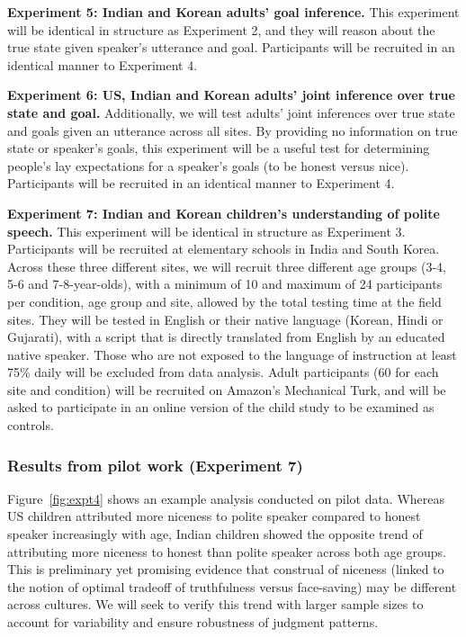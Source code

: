 {\bf Experiment 5: Indian and Korean adults' goal inference.} 
This experiment will be identical in structure as Experiment 2, and they will reason about the true state given speaker's utterance and goal. Participants will be recruited in an identical manner to Experiment 4.

{\bf Experiment 6: US, Indian and Korean adults' joint inference over true state and goal.} 
Additionally, we will test adults' joint inferences over true state and goals given an utterance across all sites. By providing no information on true state or speaker's goals, this experiment will be a useful test for determining people's lay expectations for a speaker's goals (to be honest versus nice). Participants will be recruited in an identical manner to Experiment 4.

{\bf Experiment 7: Indian and Korean children's understanding of polite speech.} 
This experiment will be identical in structure as Experiment 3. Participants will be recruited at elementary schools in India and South Korea. Across these three different sites, we will recruit three different age groups (3-4, 5-6 and 7-8-year-olds), with a minimum of 10 and maximum of 24 participants per condition, age group and site, allowed by the total testing time at the field sites. They will be tested in English or their native language (Korean, Hindi or Gujarati), with a script that is directly translated from English by an educated native speaker. Those who are not exposed to the language of instruction at least 75\% daily will be excluded from data analysis. Adult participants (60 for each site and condition) will be recruited on Amazon's Mechanical Turk, and will be asked to participate in an online version of the child study to be examined as controls.

\subsubsection{Results from pilot work (Experiment 7)} 

Figure~\ref{fig:expt4} shows an example analysis conducted on pilot data. Whereas US children attributed more niceness to polite speaker compared to honest speaker increasingly with age, Indian children showed the opposite trend of attributing more niceness to honest than polite speaker across both age groups. This is preliminary yet promising evidence that construal of niceness (linked to the notion of optimal tradeoff of truthfulness versus face-saving) may be different across cultures. We will seek to verify this trend with larger sample sizes to account for variability and ensure robustness of judgment patterns.

